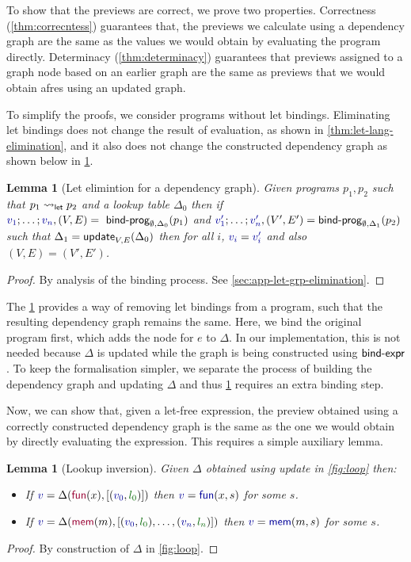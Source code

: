 \documentclass[english,crc,references=cleveref]{programming}
\newcounter{thc}
\theoremstyle{plain}
\newtheorem{lem}[thc]{Lemma}
\theoremstyle{definition}
\newcommand{\ident}[1]{\textnormal{\textcolor{idclr}{\sffamily #1}}}
\newcommand{\bndclr}[1]{\textcolor{kvdclr}{#1}}
\newcommand{\blblclr}[1]{\textcolor{numclr}{#1}}
\newcommand{\bnd}[1]{\textnormal{\textcolor{kvdclr}{\sffamily #1}}}
\newcommand{\bknd}[1]{\textnormal{\textcolor{prepclr}{\sffamily #1}}}
\begin{document}
To show that the previews are correct, we prove two properties. Correctness (\cref{thm:correcntess})
guarantees that, the previews we calculate using a dependency graph are the same as the values we
would obtain by evaluating the program directly. Determinacy (\cref{thm:determinacy})
guarantees that previews assigned to a graph node based on an earlier graph are the same as
previews that we would obtain afres using an updated graph.

To simplify the proofs, we consider programs without let bindings. Eliminating let bindings does
not change the result of evaluation, as shown in \cref{thm:let-lang-elimination}, and it also
does not change the constructed dependency graph as shown below in \cref{thm:let-grp-elimination}.

\begin{lem}[Let elimintion for a dependency graph]
\label{thm:let-grp-elimination}
Given programs $p_1, p_2$ such that $p_1 \rightsquigarrow_\ident{let} p_2$ and a lookup table
$\Delta_0$ then if $\bndclr{v_1}; \ldots; \bndclr{v_n}, (V, E) = \ident{bind-prog}_{\emptyset, \Delta_0}(p_1)$ and
$\bndclr{v'_1};\ldots;\bndclr{v'_n}, (V', E') = \ident{bind-prog}_{\emptyset, \Delta_1}(p_2)$ such that $\Delta_1 = \ident{update}_{V, E}(\Delta_0)$
then for all $i$, $\bndclr{v_i} = \bndclr{v'_i}$ and also $(V, E) = (V', E')$.
\end{lem}
\begin{proof}
By analysis of the binding process. See \cref{sec:app-let-grp-elimination}.
\end{proof}
%
%
The \cref{thm:let-grp-elimination} provides a way of removing let bindings from a program,
such that the resulting dependency graph remains the same. Here, we bind the original program
first, which adds the node for $e$ to $\Delta$. In our implementation, this is not needed
because $\Delta$ is updated while the graph is being constructed using $\ident{bind-expr}$.
To keep the formalisation simpler, we separate the process of building the dependency graph
and updating $\Delta$ and thus \cref{thm:let-grp-elimination} requires an extra binding step.

Now, we can show that, given a let-free expression, the preview obtained using a correctly
constructed dependency graph is the same as the one we would obtain by directly evaluating the
expression. This requires a simple auxiliary lemma.

\begin{lem}[Lookup inversion]
\label{thm:lemma-lookup}
Given $\Delta$ obtained using \ident{update} in \cref{fig:loop} then:
\begin{itemize}
\raggedright
\item If $\bndclr{v}=\Delta(\bknd{fun}(x),[(\bndclr{v_0}, \blblclr{l_0})])$
then $\bndclr{v}=\bnd{fun}(x, s)$ for some $s$.
\item If $\bndclr{v}=\Delta(\bknd{mem}(m),[(\bndclr{v_0}, \blblclr{l_0}), \ldots, (\bndclr{v_n}, \blblclr{l_n})])$
then $\bndclr{v}=\bnd{mem}(m, s)$ for some $s$.
\end{itemize}
\end{lem}
\begin{proof}
By construction of $\Delta$ in \cref{fig:loop}.
\end{proof}
\end{document}
